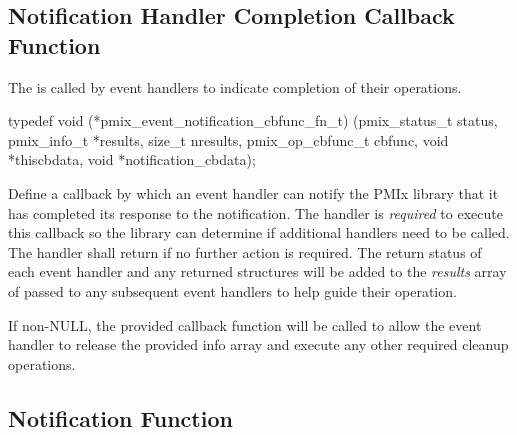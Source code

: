 \subsection{Notification Handler Completion Callback Function}

\summary

The  is called by event handlers to indicate completion of their operations.

\cspecificstart
\begin{codepar}
typedef void (*pmix_event_notification_cbfunc_fn_t)
    (pmix_status_t status,
     pmix_info_t *results, size_t nresults,
     pmix_op_cbfunc_t cbfunc, void *thiscbdata,
     void *notification_cbdata);
\end{codepar}
\cspecificend

\begin{arglist}
\end{arglist}

\descr

Define a callback by which an event handler can notify the \ac{PMIx} library that it has completed its response to the notification. The handler is \textit{required} to execute this callback so the library can determine if additional handlers need to be called. The handler shall return  if no further action is required. The return status of each event handler and any returned  structures will be added to the \textit{results} array of  passed to any subsequent event handlers to help guide their operation.

If non-NULL, the provided callback function will be called to allow the event handler to release the provided info array and execute any other required cleanup operations.


\subsection{Notification Function}

